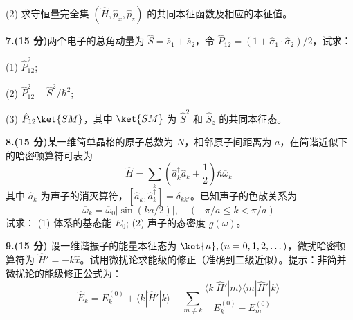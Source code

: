 (2) 求守恒量完全集 $(\hat{H}, \hat{p}_x, \hat{p}_z)$ 的共同本征函数及相应的本征值。

\textbf{7.(15 分)}两个电子的总角动量为 $\hat{S} = \hat{s}_1 + \hat{s}_2$，令 $\hat{P}_{12} = (1 + \hat{\sigma}_1 \cdot \hat{\sigma}_2)/2$，试求：

(1) $\hat{P}_{12}^2$;

(2) $\hat{P}_{12}^2 - \hat{S}^2/\hbar^2$;

(3) $\hat{P}_{12} \ket{SM}$，其中 $\ket{SM}$ 为 $\hat{S}^2$ 和 $\hat{S}_z$ 的共同本征态。

\textbf{8.(15 分)}某一维简单晶格的原子总数为 $N$，相邻原子间距离为 $a$，在简谐近似下的哈密顿算符可表为
$$\hat{H} = \sum_k \left(\hat a_k^\dagger \hat a_k + \frac{1}{2}\right)\hbar \overline{\omega}_k~$$
其中 $\hat a_k$ 为声子的消灭算符，$[\hat a_k, \hat a_k^\dagger] = \delta_{kk'}$。已知声子的色散关系为
$$\overline{\omega}_k = \overline{\omega}_0 |\sin(ka/2)|, \quad (-\pi/a \leq k < \pi/a)~$$
试求：
(1) 体系的基态能 $E_0$;
(2) 声子的态密度 $g(\omega)$。

\textbf{9.(15 分)} 设一维谐振子的能量本征态为 $\ket{n}, (n = 0, 1, 2, \dots)$，微扰哈密顿算符为 $\hat{H}' = -k\hat{x}$。试用微扰论求能级的修正（准确到二级近似）。提示：非简并微扰论的能级修正公式为：
$$\hat{E}_k = E_k^{(0)} + \langle k|\hat{H}'|k\rangle + \sum_{m\neq k} \frac{\langle k|\hat{H}'|m\rangle \langle m|\hat{H}'|k\rangle}{E_k^{(0)} - E_m^{(0)}}~$$